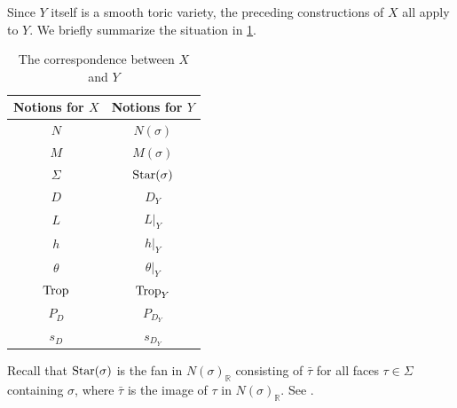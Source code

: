 Since $Y$ itself is a smooth toric variety, the preceding constructions of $X$ all apply to $Y$. We briefly summarize the situation in \cref{Tab:corrXY}.
\begin{table}[ht]
\begin{center}
\begin{tabular}{|c|c|}
  \hline
Notions for $X$ & Notions for $Y$ \\
  \hline
 $N$ & $N(\sigma)$ \\
  \hline
 $M$ & $M(\sigma)$ \\
  \hline
 $\Sigma$ & $\mathrm{Star}(\sigma)$ \\
  \hline
$D$ & $D_Y$ \\
  \hline
  $L$ & $L|_Y$ \\
  \hline
  $h$ & $h|_Y$ \\
  \hline
  $\theta$ & $\theta|_Y$ \\
  \hline
  $\operatorname{Trop}$ & $\operatorname{Trop}_Y$ \\
  \hline
 $P_D$ & $P_{D_Y}$            \\
  \hline
  $s_D$ & $s_{D_Y}$            \\
  \hline
\end{tabular}
\caption{The correspondence between $X$ and $Y$}
\label{Tab:corrXY}
\end{center}
\end{table}

Recall that $\mathrm{Star}(\sigma)$ is the fan in $N(\sigma)_{\mathbb{R}}$ consisting of $\bar{\tau}$ for all faces $\tau\in \Sigma$ containing $\sigma$, where $\bar{\tau}$ is the image of $\tau$ in $N(\sigma)_{\mathbb{R}}$. See \cite[Proposition~3.2.7]{CLS11}.

